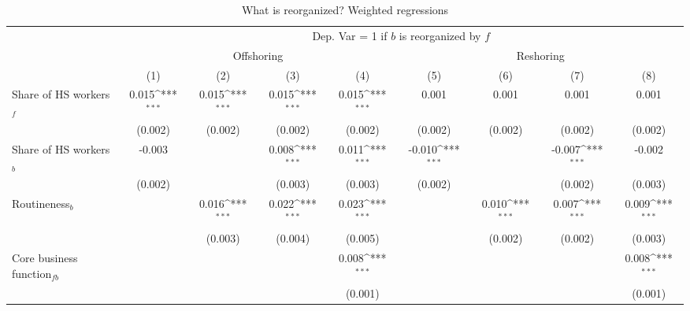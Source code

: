 \begin{table}[htbp] \footnotesize \centering
\def\sym#1{\ifmmode^{#1}\else\(^{#1}\)\fi}
\caption{What is reorganized? Weighted regressions \label{tab:reg_what_appendix}}
\renewcommand{\arraystretch}{1}
\begin{tabular}{l*{8}{c}}
\toprule
&\multicolumn{8}{c}{Dep. Var = 1 if $ b $ is reorganized by $ f $} \\
\cmidrule(lr){2-9}
                &\multicolumn{4}{c}{Offshoring}                                             &\multicolumn{4}{c}{Reshoring}                                              \\\cmidrule(lr){2-5}\cmidrule(lr){6-9}
                &\multicolumn{1}{c}{(1)}         &\multicolumn{1}{c}{(2)}         &\multicolumn{1}{c}{(3)}         &\multicolumn{1}{c}{(4)}         &\multicolumn{1}{c}{(5)}         &\multicolumn{1}{c}{(6)}         &\multicolumn{1}{c}{(7)}         &\multicolumn{1}{c}{(8)}         \\
\midrule
Share of HS workers$ _f$&    0.015\sym{***}&    0.015\sym{***}&    0.015\sym{***}&    0.015\sym{***}&    0.001         &    0.001         &    0.001         &    0.001         \\
                &  (0.002)         &  (0.002)         &  (0.002)         &  (0.002)         &  (0.002)         &  (0.002)         &  (0.002)         &  (0.002)         \\
\addlinespace
Share of HS workers$ _b$&   -0.003         &                  &    0.008\sym{***}&    0.011\sym{***}&   -0.010\sym{***}&                  &   -0.007\sym{***}&   -0.002         \\
                &  (0.002)         &                  &  (0.003)         &  (0.003)         &  (0.002)         &                  &  (0.002)         &  (0.003)         \\
\addlinespace
Routineness$ _b$&                  &    0.016\sym{***}&    0.022\sym{***}&    0.023\sym{***}&                  &    0.010\sym{***}&    0.007\sym{***}&    0.009\sym{***}\\
                &                  &  (0.003)         &  (0.004)         &  (0.005)         &                  &  (0.002)         &  (0.002)         &  (0.003)         \\
\addlinespace
Core business function$ _{fb}$&                  &                  &                  &    0.008\sym{***}&                  &                  &                  &    0.008\sym{***}\\
                &                  &                  &                  &  (0.001)         &                  &                  &                  &  (0.001)         \\

\end{tabular}
\end{table}
